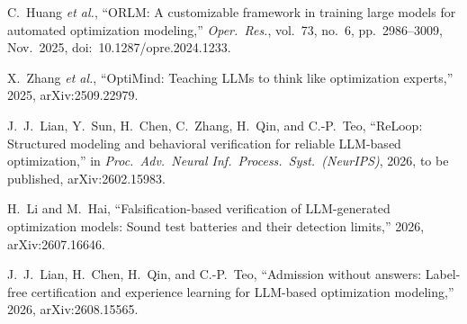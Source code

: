 \documentclass[11pt,a4paper]{article}
\begin{document}
{\begin{enumerate}[label={[\arabic*]}, leftmargin=2.2em, itemsep=1pt]
\item C.~Huang \textit{et al.}, ``ORLM: A customizable framework in training large models for automated optimization modeling,'' \textit{Oper.\ Res.}, vol.~73, no.~6, pp.~2986--3009, Nov.\ 2025, doi:~10.1287/opre.2024.1233.
\item X.~Zhang \textit{et al.}, ``OptiMind: Teaching LLMs to think like optimization experts,'' 2025, arXiv:2509.22979.
\item J.~J.~Lian, Y.~Sun, H.~Chen, C.~Zhang, H.~Qin, and C.-P.~Teo, ``ReLoop: Structured modeling and behavioral verification for reliable LLM-based optimization,'' in \textit{Proc.\ Adv.\ Neural Inf.\ Process.\ Syst.\ (NeurIPS)}, 2026, to be published, arXiv:2602.15983.
\item H.~Li and M.~Hai, ``Falsification-based verification of LLM-generated optimization models: Sound test batteries and their detection limits,'' 2026, arXiv:2607.16646.
\item J.~J.~Lian, H.~Chen, H.~Qin, and C.-P.~Teo, ``Admission without answers: Label-free certification and experience learning for LLM-based optimization modeling,'' 2026, arXiv:2608.15565.
\end{enumerate}
}
\end{document}
